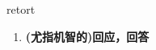 
\begin{frame}
{\huge retort}
\begin{center}
\begin{enumerate}\Large
  \item \textbf{(尤指机智的)回应，回答}
\end{enumerate}
\end{center}
\end{frame}
